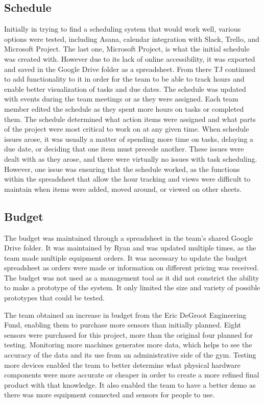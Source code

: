 \documentclass[PPFS.tex]{template/subfiles}
\begin{document}
    \subsection{Schedule}
	Initially in trying to find a scheduling system that would work well, various options were tested, including Asana, calendar integration with Slack, Trello, and Microsoft Project. The last one, Microsoft Project, is what the initial schedule was created with. However due to its lack of online accessibility, it was exported and saved in the Google Drive folder as a spreadsheet. From there TJ continued to add functionality to it in order for the team to be able to track hours and enable better visualization of tasks and due dates. The schedule was updated with events during the team meetings or as they were assigned. Each team member edited the schedule as they spent more hours on tasks or completed them. The schedule determined what action items were assigned and what parts of the project were most critical to work on at any given time. When schedule issues arose, it was usually a matter of spending more time on tasks, delaying a due date, or deciding that one item must precede another. These issues were dealt with as they arose, and there were virtually no issues with task scheduling. However, one issue was ensuring that the schedule worked, as the functions within the spreadsheet that allow the hour tracking and views were difficult to maintain when items were added, moved around, or viewed on other sheets.
	
    \subsection{Budget}
    The budget was maintained through a spreadsheet in the team's shared Google Drive folder. It was maintained by Ryan and was updated multiple times, as the team made multiple equipment orders. It was necessary to update the budget spreadsheet as orders were made or information on different pricing was received. The budget was not used as a management tool as it did not constrict the ability to make a prototype of the system. It only limited the size and variety of possible prototypes that could be tested.
    
    The team obtained an increase in budget from the Eric DeGroot Engineering Fund, enabling them to purchase more sensors than initially planned. Eight sensors were purchased for this project, more than the original four planned for testing. Monitoring more machines generates more data, which helps to see the accuracy of the data and its use from an administrative side of the gym. Testing more devices enabled the team to better determine what physical hardware components were more accurate or cheaper in order to create a more refined final product with that knowledge. It also enabled the team to have a better demo as there was more equipment connected and sensors for people to use.
    
\end{document}

